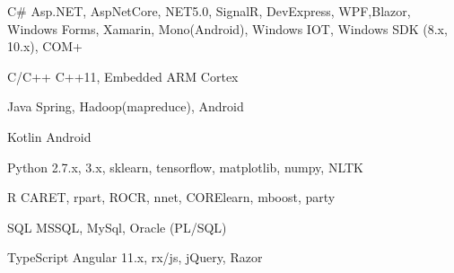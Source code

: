 

\begin{cvskills}


  \cvskill
    {C\#} %
    {Asp.NET, AspNetCore, NET5.0, SignalR, DevExpress, WPF,\newline Blazor, Windows Forms, Xamarin, Mono(Android), Windows IOT, Windows SDK (8.x, 10.x), COM+} %

\cvskill
{C/C++} %
{C++11, Embedded ARM Cortex} %

\cvskill
{Java} %
{Spring, Hadoop(mapreduce), Android} %

\cvskill
{Kotlin} %
{Android} %

\cvskill
{Python} %
{2.7.x, 3.x, sklearn, tensorflow, matplotlib, numpy, NLTK} %

\cvskill
{R} %
{CARET, rpart, ROCR, nnet, CORElearn, mboost, party} %

\cvskill
{SQL} %
{MSSQL, MySql, Oracle (PL/SQL)} %

\cvskill
{TypeScript} %
{Angular 11.x, rx/js, jQuery, Razor} %


\end{cvskills}
